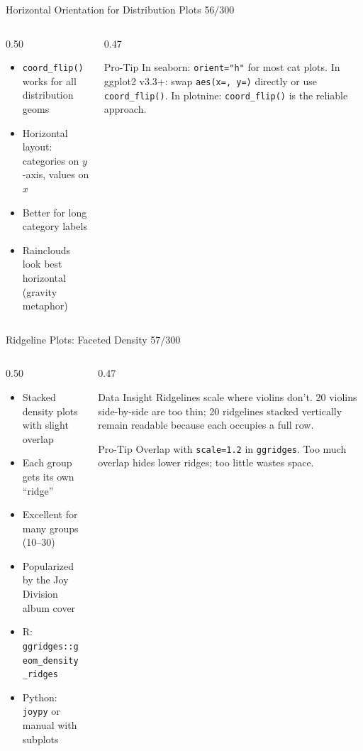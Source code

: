\documentclass[10pt]{beamer}
\newcommand{\smark}[1]{\hfill{\scriptsize\color{codegray}#1}}
\begin{document}
\begin{frame}{Horizontal Orientation for Distribution Plots}
\smark{56/300}
\begin{columns}[T]
\begin{column}{0.50\textwidth}
\begin{itemize}
    \item \texttt{coord\_flip()} works for all distribution geoms
    \item Horizontal layout: categories on $y$-axis, values on $x$
    \item Better for long category labels
    \item Rainclouds look best horizontal (gravity metaphor)
\end{itemize}
\end{column}
\begin{column}{0.47\textwidth}
\begin{alertblock}{Pro-Tip}
    \scriptsize In seaborn: \texttt{orient="h"} for most cat plots. In ggplot2 v3.3+: swap \texttt{aes(x=, y=)} directly or use \texttt{coord\_flip()}. In plotnine: \texttt{coord\_flip()} is the reliable approach.
\end{alertblock}
\end{column}
\end{columns}
\end{frame}

\begin{frame}{Ridgeline Plots: Faceted Density}
\smark{57/300}
\begin{columns}[T]
\begin{column}{0.50\textwidth}
\begin{itemize}
    \item Stacked density plots with slight overlap
    \item Each group gets its own ``ridge''
    \item Excellent for many groups (10--30)
    \item Popularized by the Joy Division album cover
    \item R: \texttt{ggridges::geom\_density\_ridges}
    \item Python: \texttt{joypy} or manual with subplots
\end{itemize}
\end{column}
\begin{column}{0.47\textwidth}
\begin{exampleblock}{Data Insight}
    \scriptsize Ridgelines scale where violins don't. 20 violins side-by-side are too thin; 20 ridgelines stacked vertically remain readable because each occupies a full row.
\end{exampleblock}
\vspace{0.2cm}
\begin{alertblock}{Pro-Tip}
    \scriptsize Overlap with \texttt{scale=1.2} in \texttt{ggridges}. Too much overlap hides lower ridges; too little wastes space.
\end{alertblock}
\end{column}
\end{columns}
\end{frame}
\end{document}
